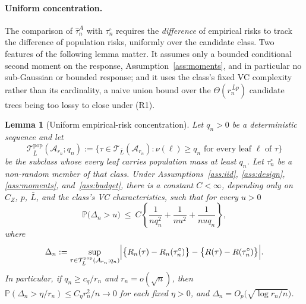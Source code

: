\documentclass[11pt]{article}
\theoremstyle{plain}
\newtheorem{lemma}[theorem]{Lemma}
\theoremstyle{definition}
\theoremstyle{remark}
\newcommand{\PP}{\mathbb{P}}
\newcommand{\cA}{\mathcal{A}}
\newcommand{\cT}{\mathcal{T}}
\begin{document}
\paragraph{Uniform concentration.}
The comparison of \(\hat\tau^A_n\) with \(\tau_n^\circ\) requires the
\emph{difference} of empirical risks to track the difference of population
risks, uniformly over the candidate class. Two features of the following lemma
matter. It assumes only a bounded conditional second moment on the response,
Assumption~\ref{ass:moments}, and in particular no sub-Gaussian or bounded
response; and it uses the class's fixed VC complexity rather than its
cardinality, a naive union bound over the \(\Theta(r_n^{\,\bar Lp})\)
candidate trees being too lossy to close under (R1).

\begin{lemma}[Uniform empirical-risk concentration]\label{lem:uep-second-moment}
Let \(q_n>0\) be a deterministic sequence and let
\[
  \cT^{\mathrm{pop}}_{\bar L}(\cA_{r_n};q_n)
  :=
  \bigl\{\tau\in\cT_{\bar L}(\cA_{r_n}):
    \nu(\ell)\ge q_n\text{ for every leaf }\ell\text{ of }\tau\bigr\}
\]
be the subclass whose every leaf carries population mass at least \(q_n\).
Let \(\tau_n^\circ\) be a non-random member of that class. Under
Assumptions~\ref{ass:iid}, \ref{ass:design}, \ref{ass:moments},
and~\ref{ass:budget}, there is a constant \(C<\infty\), depending only on
\(C_Z\), \(p\), \(\bar L\), and the class's VC characteristics, such that for
every \(u>0\)
\[
  \PP\bigl(\Delta_n>u\bigr)
  \ \le\
  C\left\{\frac1{nq_n^2}+\frac1{nu^2}+\frac1{nuq_n}\right\},
\]
where
\[
  \Delta_n
  :=
  \sup_{\tau\in\cT^{\mathrm{pop}}_{\bar L}(\cA_{r_n};q_n)}
  \Bigl|
    \bigl\{R_n(\tau)-R_n(\tau_n^\circ)\bigr\}
    -\bigl\{R(\tau)-R(\tau_n^\circ)\bigr\}
  \Bigr| .
\]
In particular, if \(q_n\ge c_q/r_n\) and \(r_n=o(\sqrt n)\), then
\(\PP(\Delta_n>\eta/r_n)\le C_\eta r_n^2/n\to0\) for each fixed \(\eta>0\),
and \(\Delta_n=O_p\bigl(\sqrt{\log r_n/n}\bigr)\).
\end{lemma}
\end{document}
